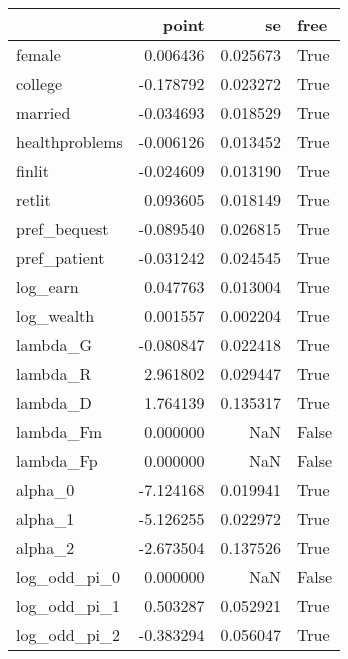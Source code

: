 \begin{tabular}{lrrl}
\toprule
{} &     point &        se &   free \\
\midrule
female         &  0.006436 &  0.025673 &   True \\
college        & -0.178792 &  0.023272 &   True \\
married        & -0.034693 &  0.018529 &   True \\
healthproblems & -0.006126 &  0.013452 &   True \\
finlit         & -0.024609 &  0.013190 &   True \\
retlit         &  0.093605 &  0.018149 &   True \\
pref\_bequest   & -0.089540 &  0.026815 &   True \\
pref\_patient   & -0.031242 &  0.024545 &   True \\
log\_earn       &  0.047763 &  0.013004 &   True \\
log\_wealth     &  0.001557 &  0.002204 &   True \\
lambda\_G       & -0.080847 &  0.022418 &   True \\
lambda\_R       &  2.961802 &  0.029447 &   True \\
lambda\_D       &  1.764139 &  0.135317 &   True \\
lambda\_Fm      &  0.000000 &       NaN &  False \\
lambda\_Fp      &  0.000000 &       NaN &  False \\
alpha\_0        & -7.124168 &  0.019941 &   True \\
alpha\_1        & -5.126255 &  0.022972 &   True \\
alpha\_2        & -2.673504 &  0.137526 &   True \\
log\_odd\_pi\_0   &  0.000000 &       NaN &  False \\
log\_odd\_pi\_1   &  0.503287 &  0.052921 &   True \\
log\_odd\_pi\_2   & -0.383294 &  0.056047 &   True \\
\bottomrule
\end{tabular}
